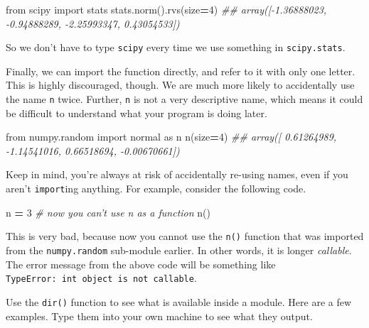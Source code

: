 \documentclass[12pt,krantz2]{krantz}
\makeatletter
\newenvironment{Shaded}{\begin{snugshade}}{\end{snugshade}}
\newcommand{\CommentTok}[1]{\textcolor[rgb]{0.37,0.37,0.37}{\textit{#1}}}
\newcommand{\DecValTok}[1]{\textcolor[rgb]{0.06,0.06,0.06}{#1}}
\newcommand{\ImportTok}[1]{#1}
\newcommand{\NormalTok}[1]{#1}
\newcommand{\OperatorTok}[1]{\textcolor[rgb]{0.43,0.43,0.43}{\textbf{#1}}}
\newenvironment{kframe}{%
\medskip{}
\setlength{\fboxsep}{.8em}
 \def\at@end@of@kframe{}%
 \ifinner\ifhmode%
  \def\at@end@of@kframe{\end{minipage}}%
  \begin{minipage}{\columnwidth}%
 \fi\fi%
 \def\FrameCommand##1{\hskip\@totalleftmargin \hskip-\fboxsep
 \colorbox{shadecolor}{##1}\hskip-\fboxsep
     \hskip-\linewidth \hskip-\@totalleftmargin \hskip\columnwidth}%
 \MakeFramed {\advance\hsize-\width
   \@totalleftmargin\z@ \linewidth\hsize
   \@setminipage}}%
 {\par\unskip\endMakeFramed%
 \at@end@of@kframe}
\renewenvironment{Shaded}{\begin{kframe}}{\end{kframe}}
\makeatother
\begin{document}
\begin{Shaded}
\begin{Highlighting}[]
\ImportTok{from}\NormalTok{ scipy }\ImportTok{import}\NormalTok{ stats}
\NormalTok{stats.norm().rvs(size}\OperatorTok{=}\DecValTok{4}\NormalTok{)}
\CommentTok{## array([-1.36888023, -0.94888289, -2.25993347,  0.43054533])}
\end{Highlighting}
\end{Shaded}

So we don't have to type \texttt{scipy} every time we use something in \texttt{scipy.stats}.

Finally, we can import the function directly, and refer to it with only one letter. This is highly discouraged, though. We are much more likely to accidentally use the name \texttt{n} twice. Further, \texttt{n} is not a very descriptive name, which means it could be difficult to understand what your program is doing later.

\begin{Shaded}
\begin{Highlighting}[]
\ImportTok{from}\NormalTok{ numpy.random }\ImportTok{import}\NormalTok{ normal }\ImportTok{as}\NormalTok{ n}
\NormalTok{n(size}\OperatorTok{=}\DecValTok{4}\NormalTok{)}
\CommentTok{## array([ 0.61264989, -1.14541016,  0.66518694, -0.00670661])}
\end{Highlighting}
\end{Shaded}

Keep in mind, you're always at risk of accidentally re-using names, even if you aren't \texttt{import}ing anything. For example, consider the following code.

\begin{Shaded}
\begin{Highlighting}[]
\NormalTok{n }\OperatorTok{=} \DecValTok{3} \CommentTok{# now you can't use n as a function }
\NormalTok{n()   }
\end{Highlighting}
\end{Shaded}

This is very bad, because now you cannot use the \texttt{n()} function that was imported from the \texttt{numpy.random} sub-module earlier. In other words, it is longer \emph{callable}. The error message from the above code will be something like \texttt{TypeError:\ \textquotesingle{}int\textquotesingle{}\ object\ is\ not\ callable}.

Use the \texttt{dir()} function to see what is available inside a module. Here are a few examples. Type them into your own machine to see what they output.
\end{document}
